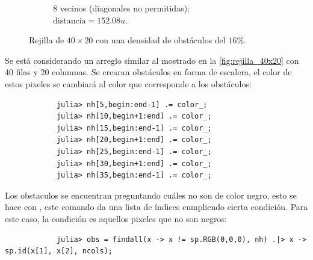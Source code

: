 \begin{enumerate}
\begin{solution}
\begin{figure}[ht!]
\begin{subfigure}{0.4\textwidth}
                \caption{8 vecinos (diagonales no permitidas); $\text{distancia} = 152.08 u$.}
            \end{subfigure}
            \caption{Rejilla de $40 \times 20$ con una densidad de obstáculos del $16\%$.}
            \label{fig:rejilla_escalera}
        \end{figure}

        Se está considerando un arreglo similar al mostrado en la \cref{fig:rejilla_40x20} con 40 filas y 20 columnas. Se crearan obstáculos en forma de escalera, el color de estos pixeles se cambiará al color que corresponde a los obstáculos:
        \begin{verbatim}
            julia> nh[5,begin:end-1] .= color_;
            julia> nh[10,begin+1:end] .= color_;
            julia> nh[15,begin:end-1] .= color_;
            julia> nh[20,begin+1:end] .= color_;
            julia> nh[25,begin:end-1] .= color_;
            julia> nh[30,begin+1:end] .= color_;
            julia> nh[35,begin:end-1] .= color_;
        \end{verbatim}
        Los obstaculos se encuentran preguntando cuáles no son de color negro, esto se hace con , este comando da una lista de índices cumpliendo cierta condición. Para este caso, la condición es aquellos pixeles que no son negros:
        \begin{verbatim}
            julia> obs = findall(x -> x != sp.RGB(0,0,0), nh) .|> x -> sp.id(x[1], x[2], ncols);
        \end{verbatim}


\end{solution}
\end{enumerate}
